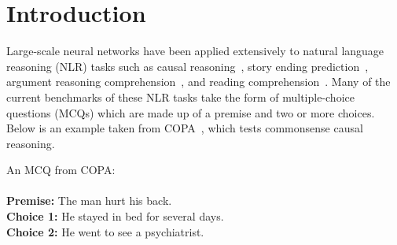 \section{Introduction}
\label{sec:intro}


Large-scale neural networks have been applied extensively
to natural language reasoning (NLR) tasks such as
causal reasoning~\cite{roemmele2011choice}, 
story ending prediction~\cite{roc2017},
argument reasoning comprehension~\cite{arct2018}, and 
reading comprehension~\cite{yu2020reclor}.
Many of the current benchmarks of these NLR tasks take the 
form of multiple-choice questions (MCQs) which are made up 
of a premise and two or more choices. Below is an example taken 
from COPA~\cite{roemmele2011choice}, which tests commonsense causal 
reasoning.

\begin{example}\label{ex:copa}
An MCQ from COPA:\\ \\
\noindent
\textbf{Premise:} The man hurt his back.\\
\textbf{Choice 1:} He stayed in bed for several days.  \checksymbol \\
\textbf{Choice 2:} He went to see a psychiatrist. \crosssymbol 
\end{example}

